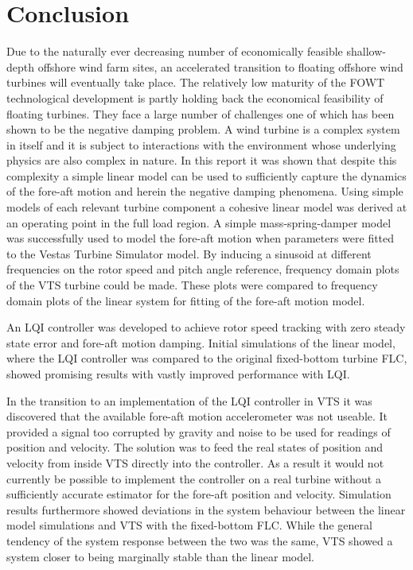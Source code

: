 \section{Conclusion} \label{sec:concl}
Due to the naturally ever decreasing number of economically feasible shallow-depth offshore wind farm sites, an accelerated transition to floating offshore wind turbines will eventually take place. The relatively low maturity of the FOWT technological development is partly holding back the economical feasibility of floating turbines. They face a large number of challenges one of which has been shown to be the negative damping problem. A wind turbine is a complex system in itself and it is subject to interactions with the environment whose underlying physics are also complex in nature. In this report it was shown that despite this complexity a simple linear model can be used to sufficiently capture the dynamics of the fore-aft motion and herein the negative damping phenomena. Using simple models of each relevant turbine component a cohesive linear model was derived at an operating point in the full load region. A simple mass-spring-damper model was successfully used to model the fore-aft motion when parameters were fitted to the Vestas Turbine Simulator model. By inducing a sinusoid at different frequencies on the rotor speed and pitch angle reference, frequency domain plots of the VTS turbine could be made. These plots were compared to frequency domain plots of the linear system for fitting of the fore-aft motion model.

\smallskip
An LQI controller was developed to achieve rotor speed tracking with zero steady state error and fore-aft motion damping. Initial simulations of the linear model, where the LQI controller was compared to the original fixed-bottom turbine FLC, showed promising results with vastly improved performance with LQI.

In the transition to an implementation of the LQI controller in VTS it was discovered that the available fore-aft motion accelerometer was not useable. It provided a signal too corrupted by gravity and noise to be used for readings of position and velocity. The solution was to feed the real states of position and velocity from inside VTS directly into the controller. As a result it would not currently be possible to implement the controller on a real turbine without a sufficiently accurate estimator for the fore-aft position and velocity. Simulation results furthermore showed deviations in the system behaviour between the linear model simulations and VTS with the fixed-bottom FLC. While the general tendency of the system response between the two was the same, VTS showed a system closer to being marginally stable than the linear model.

